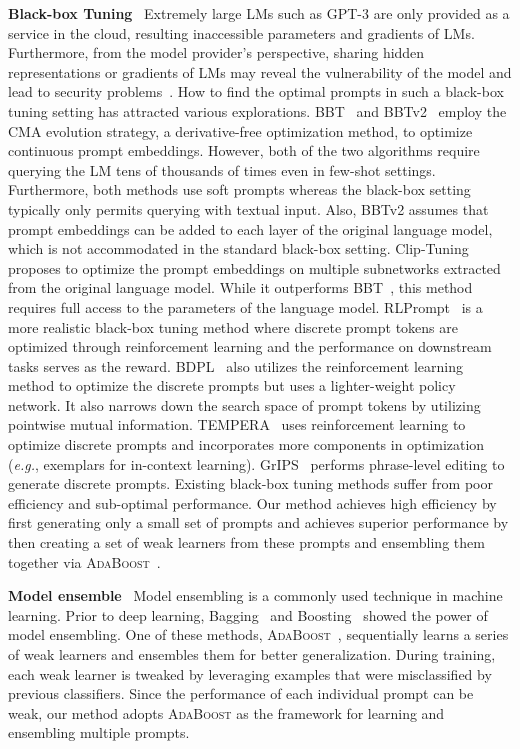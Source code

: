 \documentclass{article}
\theoremstyle{plain}
\theoremstyle{definition}
\theoremstyle{remark}
\begin{document}
\textbf{Black-box Tuning} \ 
Extremely large LMs such as GPT-3 are only provided as a service in the cloud, resulting inaccessible parameters and gradients of LMs. Furthermore, from the model provider's perspective, sharing hidden representations or gradients of LMs may reveal the vulnerability of the model and lead to security problems~\citep{tramer2016stealing}. How to find the optimal prompts in such a black-box tuning setting has attracted various explorations.
BBT~\citep{sun2022bbt} and BBTv2~\citep{sun2022bbtv2} employ the CMA evolution strategy, a derivative-free optimization method, to optimize continuous prompt embeddings. However, both of the two algorithms require querying the LM tens of thousands of times even in few-shot settings. 
Furthermore, both methods use soft prompts whereas the black-box setting typically only permits querying with textual input. Also, BBTv2 assumes that prompt embeddings can be added to each layer of the original language model, which is not accommodated in the standard black-box setting.
Clip-Tuning~\citep{chai2022clip} proposes to optimize the prompt embeddings on multiple subnetworks extracted from the original language model. While it outperforms BBT~\citep{sun2022bbt}, this method requires full access to the parameters of the language model.
RLPrompt~\citep{deng2022rlprompt} is a more realistic black-box tuning method where discrete prompt tokens are optimized through reinforcement learning and the performance on downstream tasks serves as the reward. 
BDPL~\citep{diao2022black} also utilizes the reinforcement learning method to optimize the discrete prompts but uses a lighter-weight policy network. It also narrows down the search space of prompt tokens by utilizing pointwise mutual information.
TEMPERA~\citep{zhang2022tempera} uses reinforcement learning to optimize discrete prompts and incorporates more components in optimization (\emph{e.g.}, exemplars for in-context learning).
GrIPS~\citep{prasad2022grips} performs phrase-level editing to generate discrete prompts. 
Existing black-box tuning methods suffer from poor efficiency and sub-optimal performance. Our method achieves high efficiency by first generating only a small set of prompts and achieves superior performance by then creating a set of weak learners from these prompts and ensembling them together via \textsc{AdaBoost}~\citep{freund1997decision}.

\textbf{Model ensemble} \
Model ensembling is a commonly used technique in machine learning. Prior to deep learning, Bagging~\citep{breiman1996bagging, breiman2001random} and Boosting~\citep{freund1997decision, friedman2001greedy} showed the power of model ensembling. One of these methods, \textsc{AdaBoost}~\citep{freund1997decision}, sequentially learns a series of weak learners and ensembles them for better generalization. During training, each weak learner is tweaked by leveraging examples that were misclassified by previous classifiers. Since the performance of each individual prompt can be weak, our method adopts \textsc{AdaBoost} as the framework for learning and ensembling multiple prompts.
\end{document}
